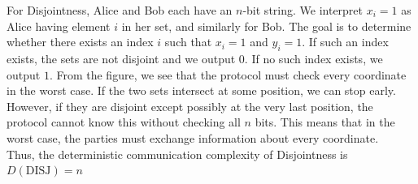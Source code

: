For Disjointness, Alice and Bob each have an $n$-bit string. We interpret $x_i = 1$ as Alice having element $i$ in her set, and similarly for Bob. The goal is to determine whether there exists an index $i$ such that $x_i = 1$ and $y_i = 1$. If such an index exists, the sets are not disjoint  and we output $0$. If no such index exists, we output $1$. From the figure, we see that the protocol must check every coordinate in the worst case. If the two sets intersect at some position, we can stop early. However, if they are disjoint except possibly at the very last position, the protocol cannot know this without checking all $n$ bits. This means that in the worst case, the parties must exchange information about every coordinate.\\

Thus, the deterministic communication complexity of Disjointness is $D(\text{DISJ}) = n$

